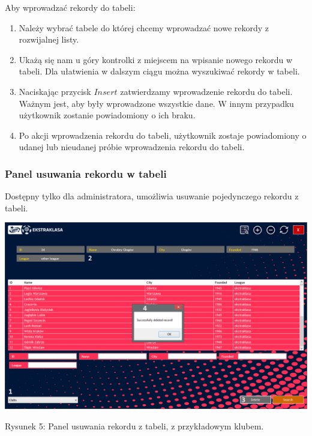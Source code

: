 \documentclass[12pt,a4paper]{article}
\begin{document}
    Aby wprowadzać rekordy do tabeli:
    \begin{enumerate}
        \item Należy wybrać tabele do której chcemy wprowadzać nowe rekordy z rozwijalnej listy.
        \item Ukażą się nam u góry kontrolki z miejscem na wpisanie nowego rekordu w tabeli. Dla ułatwienia w dalszym ciągu można wyszukiwać rekordy w tabeli.
        \item Naciskając przycisk $Insert$ zatwierdzamy wprowadzenie rekordu do tabeli. Ważnym jest, aby były wprowadzone wszystkie dane. W innym przypadku użytkownik zostanie powiadomiony o ich braku.
        \item Po akcji wprowadzenia rekordu do tabeli, użytkownik zostaje powiadomiony o udanej lub nieudanej próbie wprowadzenia rekordu do tabeli.
    \end{enumerate}
    
    \newpage
    
    \subsubsection{Panel usuwania rekordu w tabeli}
    Dostępny tylko dla administratora, umożliwia usuwanie pojedynczego rekordu z tabeli.
    \begin{center}
        \includegraphics[scale=0.47]{delete-panel.png}
        \begin{flushleft}
            \begin{scriptsize}
            \begin{list}{}{\leftmargin=13.5em}\raggedright\item\relax
            Rysunek 5: Panel usuwania rekordu z tabeli, z przykładowym klubem.
            \end{list}
            \end{scriptsize}
        \end{flushleft}
    \end{center}
    
\end{document}
